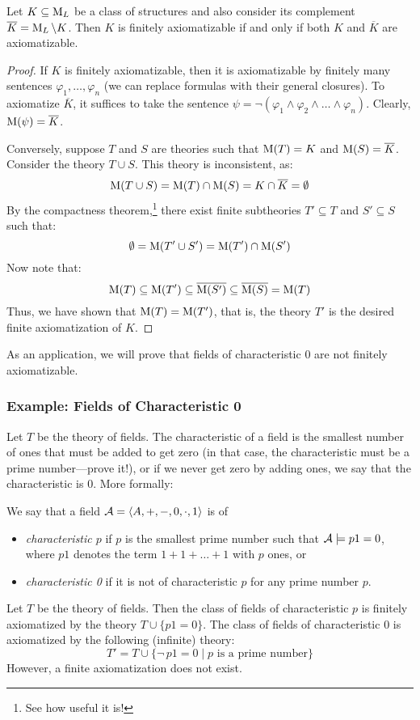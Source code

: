 \begin{theorem}\label{theorem:finite-axiomatizability}
    Let $K \subseteq \operatorname{M}_L$ be a class of structures and also consider its complement $\overline{K} = \operatorname{M}_L \setminus K$. Then $K$ is finitely axiomatizable if and only if both $K$ and $\overline{K}$ are axiomatizable.   
\end{theorem}
\begin{proof}
If $K$ is finitely axiomatizable, then it is axiomatizable by finitely many sentences $\varphi_1, \dots, \varphi_n$ (we can replace formulas with their general closures). To axiomatize $\overline{K}$, it suffices to take the sentence $\psi = \neg(\varphi_1 \land \varphi_2 \land \dots \land \varphi_n)$. Clearly, $\operatorname{M}(\psi) = \overline{K}$.

Conversely, suppose $T$ and $S$ are theories such that $\operatorname{M}(T) = K$ and $\operatorname{M}(S) = \overline{K}$. Consider the theory $T \cup S$. This theory is inconsistent, as:
$$
\operatorname{M}(T \cup S) = \operatorname{M}(T) \cap \operatorname{M}(S) = K \cap \overline{K} = \emptyset
$$
By the compactness theorem,\footnote{See how useful it is!} there exist finite subtheories $T' \subseteq T$ and $S' \subseteq S$ such that:
$$
\emptyset = \operatorname{M}(T' \cup S') = \operatorname{M}(T') \cap \operatorname{M}(S')
$$
Now note that:
$$
\operatorname{M}(T) \subseteq \operatorname{M}(T') \subseteq \overline{\operatorname{M}(S')} \subseteq \overline{\operatorname{M}(S)} = \operatorname{M}(T)
$$
Thus, we have shown that $\operatorname{M}(T) = \operatorname{M}(T')$, that is, the theory $T'$ is the desired finite axiomatization of $K$.
\end{proof}

As an application, we will prove that fields of characteristic 0 are not finitely axiomatizable.

\subsubsection*{Example: Fields of Characteristic 0}
 
Let $T$ be the theory of fields. The characteristic of a field is the smallest number of ones that must be added to get zero (in that case, the characteristic must be a prime number---prove it!), or if we never get zero by adding ones, we say that the characteristic is 0. More formally:

\begin{definition}
We say that a field $\mathcal{A} = \langle A, +, -, 0, \cdot, 1 \rangle$ is of
\begin{itemize}
    \item \emph{characteristic $p$} if $p$ is the smallest prime number such that $\mathcal{A} \models p1 = 0$, where $p1$ denotes the term $1 + 1 + \dots + 1$ with $p$ ones, or
    \item \emph{characteristic 0} if it is not of characteristic $p$ for any prime number $p$.
\end{itemize}
\end{definition}
Let $T$ be the theory of fields. Then the class of fields of characteristic $p$ is finitely axiomatized by the theory $T \cup \{p1 = 0\}$. The class of fields of characteristic 0 is axiomatized by the following (infinite) theory:
$$
T' = T \cup \{\neg\, p1 = 0 \mid p \text{ is a prime number}\}
$$
However, a finite axiomatization does not exist.

